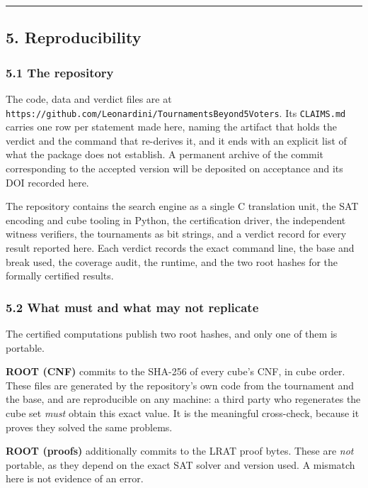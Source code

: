 \documentclass[
]{article}
\begin{document}
\begin{center}\rule{0.5\linewidth}{0.5pt}\end{center}

\subsection{5. Reproducibility}\label{reproducibility}

\subsubsection{5.1 The repository}\label{the-repository}

The code, data and verdict files are at
\texttt{https://github.com/Leonardini/TournamentsBeyond5Voters}. Its
\texttt{CLAIMS.md} carries one row per statement made here, naming the
artifact that holds the verdict and the command that re-derives it, and
it ends with an explicit list of what the package does not establish. A
permanent archive of the commit corresponding to the accepted version
will be deposited on acceptance and its DOI recorded here.

The repository contains the search engine as a single C translation
unit, the SAT encoding and cube tooling in Python, the certification
driver, the independent witness verifiers, the tournaments as bit
strings, and a verdict record for every result reported here. Each
verdict records the exact command line, the base and break used, the
coverage audit, the runtime, and the two root hashes for the formally
certified results.

\subsubsection{5.2 What must and what may not
replicate}\label{what-must-and-what-may-not-replicate}

The certified computations publish two root hashes, and only one of them
is portable.

\textbf{ROOT (CNF)} commits to the SHA-256 of every cube's CNF, in cube
order. These files are generated by the repository's own code from the
tournament and the base, and are reproducible on any machine: a third
party who regenerates the cube set \emph{must} obtain this exact value.
It is the meaningful cross-check, because it proves they solved the same
problems.

\textbf{ROOT (proofs)} additionally commits to the LRAT proof bytes.
These are \emph{not} portable, as they depend on the exact SAT solver
and version used. A mismatch here is not evidence of an error.
\end{document}
